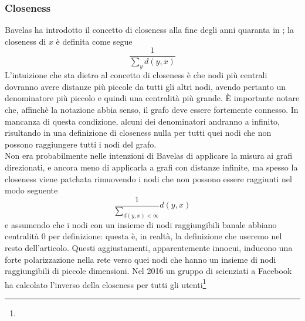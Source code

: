 \subsubsection{Closeness}
Bavelas ha introdotto il concetto di closeness alla fine degli anni quaranta in %
; la closeness di $x$ è definita come segue
\begin{equation}
    \frac{1}{\sum_y{d(y, x)}}
\end{equation}
L'intuizione che sta dietro al concetto di closeness è che nodi più centrali dovranno avere distanze più piccole da tutti gli altri nodi, avendo pertanto un denominatore più piccolo e quindi una centralità più grande. È importante notare che, affinchè la notazione abbia senso, il grafo deve essere fortemente connesso. In mancanza di questa condizione, alcuni dei denominatori andranno a infinito, risultando in una definizione di closeness nulla per tutti quei nodi che non possono raggiungere tutti i nodi del grafo.\\
Non era probabilmente nelle intenzioni di Bavelas di applicare la misura ai grafi direzionati, e ancora meno di applicarla a grafi con distanze infinite, ma spesso la closeness viene patchata rimuovendo i nodi che non possono essere raggiunti nel modo seguente
\begin{equation*}
    \frac{1}{\sum_{d(y, x) < \infty}}{d(y, x)}
\end{equation*}
e assumendo che i nodi con un insieme di nodi raggiungibili banale abbiano centralità 0 per definizione: questa è, in realtà, la definizione che useremo nel resto dell'articolo. Questi aggiustamenti, apparentemente innocui, inducono una forte polarizzazione nella rete verso quei nodi che hanno un insieme di nodi raggiungibili di piccole dimensioni. Nel 2016 un gruppo di scienziati a Facebook ha calcolato l'inverso della closeness per tutti gli utenti\footnote{%
}
